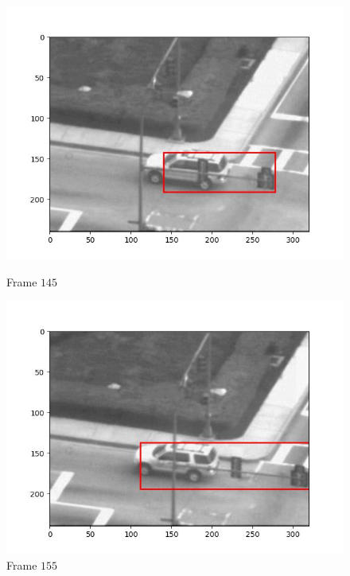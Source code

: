 \begin{figure}[H]
\begin{minipage}{.49\textwidth}
    \includegraphics[width=\textwidth]{./figures/lk_affine/car2/frame000145.jpg}
    \caption{Frame $145$}
  \end{minipage}
  \begin{minipage}{.49\textwidth}
    \centering
    \includegraphics[width=\textwidth]{./figures/lk_affine/car2/frame000155.jpg}
    \caption{Frame $155$}
  \end{minipage}
\end{figure}
